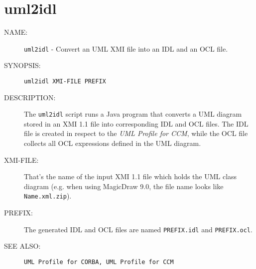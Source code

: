 \newpage
\section{uml2idl}

\begin{description}

\item [NAME:] 
  {\tt uml2idl} - Convert an UML XMI file into an IDL and an OCL file. 

\item [SYNOPSIS:] 
  {\tt uml2idl XMI-FILE PREFIX}

\item [DESCRIPTION:]
  The {\tt uml2idl} script runs a Java program that converts a UML diagram stored
  in an XMI 1.1 file into corresponding IDL and OCL files.
  The IDL file is created in respect to the {\it UML Profile for CCM}, while the
  OCL file collects all OCL expressions defined in the UML diagram.

\item [XMI-FILE:]
  That's the name of the input XMI 1.1 file which holds the UML class diagram
  (e.g. when using MagicDraw 9.0, the file name looks like {\tt Name.xml.zip}).

\item [PREFIX:]
  The generated IDL and OCL files are named {\tt PREFIX.idl} and {\tt PREFIX.ocl}.

\item [SEE ALSO:]
  {\tt UML Profile for CORBA, UML Profile for CCM}
  
\end{description}
